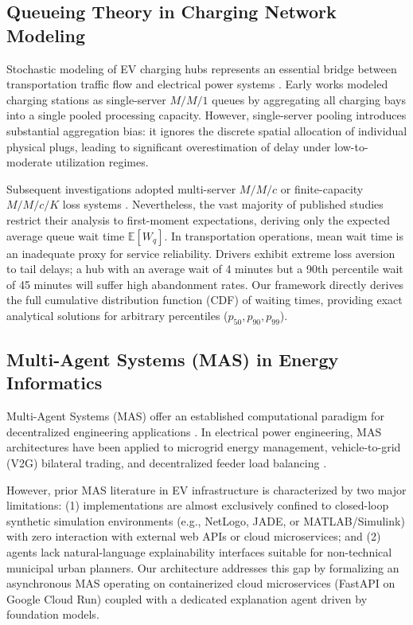 \documentclass[preprint,12pt,authoryear]{elsarticle}
\begin{document}
\subsection{Queueing Theory in Charging Network Modeling}
Stochastic modeling of EV charging hubs represents an essential bridge between transportation traffic flow and electrical power systems \citep{alizadeh2021queue}. Early works modeled charging stations as single-server $M/M/1$ queues by aggregating all charging bays into a single pooled processing capacity. However, single-server pooling introduces substantial aggregation bias: it ignores the discrete spatial allocation of individual physical plugs, leading to significant overestimation of delay under low-to-moderate utilization regimes.

Subsequent investigations adopted multi-server $M/M/c$ or finite-capacity $M/M/c/K$ loss systems \citep{shortle2018fundamentals}. Nevertheless, the vast majority of published studies restrict their analysis to first-moment expectations, deriving only the expected average queue wait time $\mathbb{E}[W_q]$. In transportation operations, mean wait time is an inadequate proxy for service reliability. Drivers exhibit extreme loss aversion to tail delays; a hub with an average wait of 4 minutes but a 90th percentile wait of 45 minutes will suffer high abandonment rates. Our framework directly derives the full cumulative distribution function (CDF) of waiting times, providing exact analytical solutions for arbitrary percentiles ($p_{50}, p_{90}, p_{99}$).

\subsection{Multi-Agent Systems (MAS) in Energy Informatics}
Multi-Agent Systems (MAS) offer an established computational paradigm for decentralized engineering applications \citep{morstyn2020multiagent}. In electrical power engineering, MAS architectures have been applied to microgrid energy management, vehicle-to-grid (V2G) bilateral trading, and decentralized feeder load balancing \citep{kempton2005electric, zhang2023multiagent}. 

However, prior MAS literature in EV infrastructure is characterized by two major limitations: (1) implementations are almost exclusively confined to closed-loop synthetic simulation environments (e.g., NetLogo, JADE, or MATLAB/Simulink) with zero interaction with external web APIs or cloud microservices; and (2) agents lack natural-language explainability interfaces suitable for non-technical municipal urban planners. Our architecture addresses this gap by formalizing an asynchronous MAS operating on containerized cloud microservices (FastAPI on Google Cloud Run) coupled with a dedicated explanation agent driven by foundation models.
\end{document}
